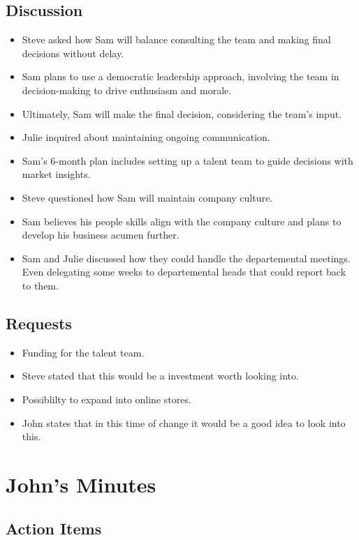\documentclass[a4paper,12pt]{article}
\begin{document}
\subsection{Discussion}
\begin{itemize}
    \item Steve asked how Sam will balance consulting the team and making final decisions without delay.
    \item Sam plans to use a democratic leadership approach, involving the team in decision-making to drive enthusiasm and morale.
    \item Ultimately, Sam will make the final decision, considering the team's input.
    \item Julie inquired about maintaining ongoing communication.
    \item Sam's 6-month plan includes setting up a talent team to guide decisions with market insights.
    \item Steve questioned how Sam will maintain company culture.
    \item Sam believes his people skills align with the company culture and plans to develop his business acumen further.
    \item Sam and Julie discussed how they could handle the departemental meetings. Even delegating some weeks to departemental heads that could report back to them.
\end{itemize}

\subsection{Requests}
\begin{itemize}
    \item Funding for the talent team.
    \item Steve stated that this would be a investment worth looking into.
    \item Possiblilty to expand into online stores.
    \item John states that in this time of change it would be a good idea to look into this.
\end{itemize}

\section{John's Minutes}
\author{Graham Pellegrini (Sam)}

\subsection{Action Items}
\end{document}
